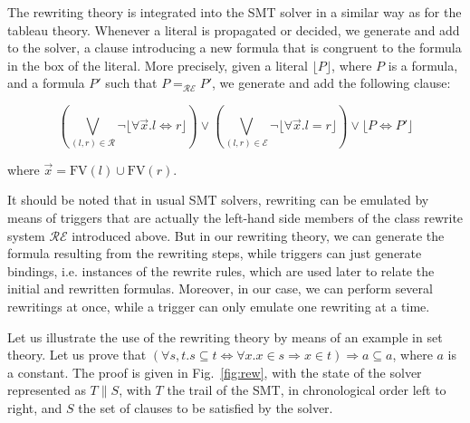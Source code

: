 The rewriting theory is integrated into the SMT solver in a similar way as for
the tableau theory. Whenever a literal is propagated or decided, we generate and
add to the solver, a clause introducing a new formula that is congruent to the
formula in the box of the literal. More precisely, given a literal
$\lfloor{}P\rfloor$, where $P$ is a formula, and a formula $P'$ such that
$P=_\mathcal{RE}P'$, we generate and add the following clause:

$$\left(\bigvee_{(l,r)\in\mathcal{R}}
\neg\lfloor\forall{}\vec{x}.l\Leftrightarrow{}r\rfloor\right)\lor
\left(\bigvee_{(l,r)\in\mathcal{E}}\neg\lfloor\forall{}\vec{x}.l=r\rfloor\right)\lor
\lfloor{}P\Leftrightarrow{}P'\rfloor$$

where $\vec{x}=\mathrm{FV}(l)\cup\mathrm{FV}(r)$.

It should be noted that in usual SMT solvers, rewriting can be emulated by means
of triggers that are actually the left-hand side members of the class rewrite
system $\mathcal{RE}$ introduced above. But in our rewriting theory, we can
generate the formula resulting from the rewriting steps, while triggers can just
generate bindings, i.e. instances of the rewrite rules, which are used later to
relate the initial and rewritten formulas. Moreover, in our case, we can perform
several rewritings at once, while a trigger can only emulate one rewriting at a
time.

Let us illustrate the use of the rewriting theory by means of an example in set
theory. Let us prove that
$(\forall{}s,t.s\subseteq{}t\Leftrightarrow{}\forall{}x.x\in{}s\Rightarrow{}
x\in{}t) \Rightarrow{} {}a\subseteq{}a$, where $a$ is a constant. The proof is given
in Fig.~\ref{fig:rew}, with the state of the solver represented as $T \parallel S$,
with $T$ the trail of the SMT, in chronological order left to right, and $S$ the set
of clauses to be satisfied by the solver.

